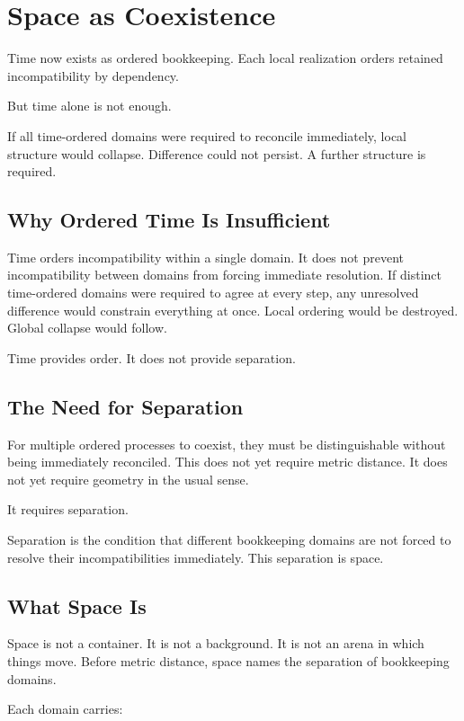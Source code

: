 \documentclass[11pt,twoside,openright]{book}
\begin{document}
\chapter{Space as Coexistence}

Time now exists as ordered bookkeeping. Each local realization orders retained incompatibility by dependency.

But time alone is not enough.

If all time-ordered domains were required to reconcile immediately, local structure would collapse. Difference could not persist. A further structure is required.

\section*{Why Ordered Time Is Insufficient}

Time orders incompatibility within a single domain. It does not prevent incompatibility between domains from forcing immediate resolution. If distinct time-ordered domains were required to agree at every step, any unresolved difference would constrain everything at once. Local ordering would be destroyed. Global collapse would follow.

Time provides order. It does not provide separation.

\section*{The Need for Separation}

For multiple ordered processes to coexist, they must be distinguishable without being immediately reconciled. This does not yet require metric distance. It does not yet require geometry in the usual sense.

It requires separation.

Separation is the condition that different bookkeeping domains are not forced to resolve their incompatibilities immediately. This separation is space.

\section*{What Space Is}

Space is not a container. It is not a background. It is not an arena in which things move. Before metric distance, space names the separation of bookkeeping domains.

Each domain carries:
\end{document}
